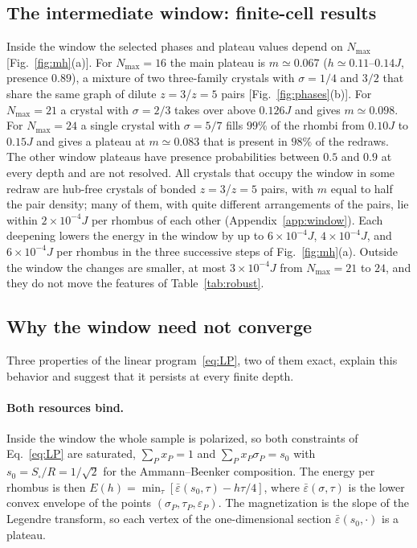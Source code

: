 \documentclass[aps,prb,twocolumn,superscriptaddress,floatfix]{revtex4-2}
\newcommand{\eps}{\varepsilon}
\begin{document}
\subsection{The intermediate window: finite-cell results}

Inside the window the selected phases and plateau values depend on $N_{\max}$ [Fig.~\ref{fig:mh}(a)]. For $N_{\max}=16$ the main plateau is $m\simeq0.067$ ($h\simeq0.11$--$0.14J$, presence $0.89$), a mixture of two three-family crystals with $\sigma=1/4$ and $3/2$ that share the same graph of dilute $z=3$/$z=5$ pairs [Fig.~\ref{fig:phases}(b)]. For $N_{\max}=21$ a crystal with $\sigma=2/3$ takes over above $0.126J$ and gives $m\simeq0.098$. For $N_{\max}=24$ a single crystal with $\sigma=5/7$ fills $99\%$ of the rhombi from $0.10J$ to $0.15J$ and gives a plateau at $m\simeq0.083$ that is present in $98\%$ of the redraws. The other window plateaus have presence probabilities between $0.5$ and $0.9$ at every depth and are not resolved. All crystals that occupy the window in some redraw are hub-free crystals of bonded $z=3$/$z=5$ pairs, with $m$ equal to half the pair density; many of them, with quite different arrangements of the pairs, lie within $2\times10^{-4}J$ per rhombus of each other (Appendix~\ref{app:window}). Each deepening lowers the energy in the window by up to $6\times10^{-4}J$, $4\times10^{-4}J$, and $6\times10^{-4}J$ per rhombus in the three successive steps of Fig.~\ref{fig:mh}(a). Outside the window the changes are smaller, at most $3\times10^{-4}J$ from $N_{\max}=21$ to $24$, and they do not move the features of Table~\ref{tab:robust}.

\subsection{Why the window need not converge}

Three properties of the linear program~\eqref{eq:LP}, two of them exact, explain this behavior and suggest that it persists at every finite depth.

\paragraph*{Both resources bind.} Inside the window the whole sample is polarized, so both constraints of Eq.~\eqref{eq:LP} are saturated, $\sum_Px_P=1$ and $\sum_Px_P\sigma_P=s_0$ with $s_0=S_\square/R=1/\sqrt2$ for the Ammann--Beenker composition. The energy per rhombus is then $E(h)=\min_\tau[\bar\eps(s_0,\tau)-h\tau/4]$, where $\bar\eps(\sigma,\tau)$ is the lower convex envelope of the points $(\sigma_P,\tau_P,\eps_P)$. The magnetization is the slope of the Legendre transform, so each vertex of the one-dimensional section $\bar\eps(s_0,\cdot)$ is a plateau.
\end{document}
